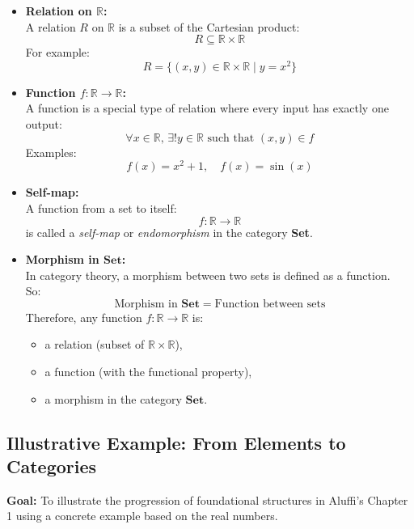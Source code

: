 \documentclass[10pt]{article}
\theoremstyle{plain}
\theoremstyle{definition}
\begin{document}
  \begin{itemize}
  	\item \textbf{Relation on \(\mathbb{R}\):} \\
  	A relation \( R \) on \(\mathbb{R}\) is a subset of the Cartesian product:
  	\[
  	R \subseteq \mathbb{R} \times \mathbb{R}
  	\]
  	For example:
  	\[
  	R = \{ (x, y) \in \mathbb{R} \times \mathbb{R} \mid y = x^2 \}
  	\]
  	
  	\item \textbf{Function \( f : \mathbb{R} \to \mathbb{R} \):} \\
  	A function is a special type of relation where every input has exactly one output:
  	\[
  	\forall x \in \mathbb{R}, \, \exists! y \in \mathbb{R} \text{ such that } (x, y) \in f
  	\]
  	Examples:
  	\[
  	f(x) = x^2 + 1, \quad f(x) = \sin(x)
  	\]
  	
  	\item \textbf{Self-map:} \\
  	A function from a set to itself:
  	\[
  	f : \mathbb{R} \to \mathbb{R}
  	\]
  	is called a \emph{self-map} or \emph{endomorphism} in the category \textbf{Set}.
  	
  	\item \textbf{Morphism in \(\mathbf{Set}\):} \\
  	In category theory, a morphism between two sets is defined as a function. \\
  	So:
  	\[
  	\text{Morphism in } \mathbf{Set} = \text{Function between sets}
  	\]
  	Therefore, any function \( f: \mathbb{R} \to \mathbb{R} \) is:
  	\begin{itemize}
  		\item a relation (subset of \(\mathbb{R} \times \mathbb{R}\)),
  		\item a function (with the functional property),
  		\item a morphism in the category \(\mathbf{Set}\).
  	\end{itemize}
  \end{itemize}
  
  
  \subsection*{Illustrative Example: From Elements to Categories}
  
  \textbf{Goal:} To illustrate the progression of foundational structures in Aluffi's Chapter 1 using a concrete example based on the real numbers.
  
\end{document}
